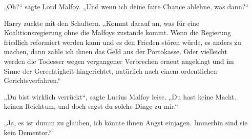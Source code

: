 „Oh?“ sagte Lord Malfoy.
„Und wenn ich deine faire Chance ablehne, was dann?“

Harry zuckte mit den Schultern.
„Kommt darauf an, was für eine Koalitionsregierung ohne die Malfoys zustande kommt. Wenn die Regierung friedlich reformiert werden kann und es den Frieden stören würde, es anders zu machen, dann zahle ich ihnen das Geld aus der Portokasse. Oder vielleicht werden die Todesser wegen vergangener Verbrechen erneut angeklagt und im Sinne der Gerechtigkeit hingerichtet, natürlich nach einem ordentlichen Gerichtsverfahren.“

„Du bist wirklich verrückt“, sagte Lucius Malfoy leise.
„Du hast keine Macht, keinen Reichtum, und doch sagst du solche Dinge zu mir.“

„Ja, es ist dumm zu glauben, ich könnte ihnen Angst einjagen. Immerhin sind sie kein Dementor.“

